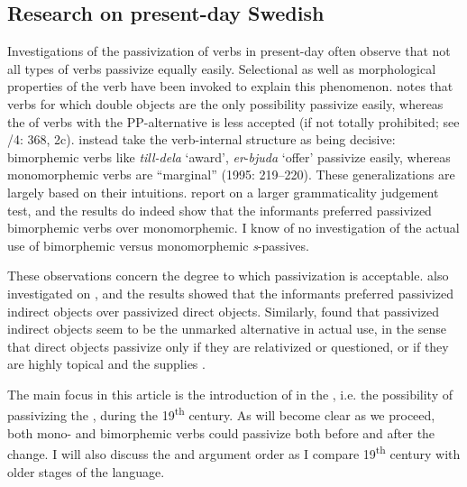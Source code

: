 \documentclass[output=paper]{langscibook}
\begin{document}
\subsection{Research on present-day Swedish}\label{sec:falk:2.1}


Investigations of the passivization of  verbs in present-day  often observe that not all types of  verbs passivize equally easily. Selectional as well as morphological properties of the verb have been invoked to explain this phenomenon. \citet{Anward1989} notes that verbs for which double objects are the only possibility passivize easily, whereas the  of verbs with the PP-alternative is less accepted (if not totally prohibited; see \citealt{TelemanEtAl1999}/4: 368, 2c). \citet{HolmbergPlatzack1995} instead take the verb-internal structure as being decisive: bimorphemic  verbs like \textit{till-dela} ‘award’, \textit{er}{}-\textit{bjuda} ‘offer’ passivize easily, whereas  monomorphemic  verbs are “marginal” (1995: 219–220). These generalizations are largely based on their intuitions. \citet{HaddicanHolmberg2019} report on a larger grammaticality judgement test, and the results do indeed show that the informants preferred passivized bimorphemic verbs over monomorphemic. I know of no investigation of the actual use of bimorphemic versus monomorphemic  \textit{s}{}-passives.


These observations concern the degree to which passivization is acceptable. \citet{HaddicanHolmberg2019} also investigated  on , and the results showed that the informants preferred passivized indirect objects over passivized direct objects. Similarly, \citet{Lundquist2004} found that passivized indirect objects seem to be the unmarked alternative in actual use, in the sense that direct objects passivize only if they are relativized or questioned, or if they are highly topical and the  supplies .



The main focus in this article is the introduction of  in the , i.e. the possibility of passivizing the , during the 19\textsuperscript{th} century. As will become clear as we proceed, both mono- and bimorphemic  verbs could passivize both before and after the change. I will also discuss the  and argument order as I compare 19\textsuperscript{th} century  with older stages of the language.
\end{document}

